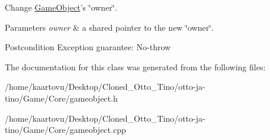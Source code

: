 Change \hyperlink{class_course_1_1_game_object}{Game\-Object}'s \char`\"{}owner\char`\"{}. 


\begin{DoxyParams}{Parameters}
{\em owner} & a shared pointer to the new \char`\"{}owner\char`\"{}. \\
\hline
\end{DoxyParams}
\begin{DoxyPostcond}{Postcondition}
Exception guarantee\-: No-\/throw 
\end{DoxyPostcond}


The documentation for this class was generated from the following files\-:\begin{DoxyCompactItemize}
\item 
/home/kaartovu/\-Desktop/\-Cloned\-\_\-\-Otto\-\_\-\-Tino/otto-\/ja-\/tino/\-Game/\-Core/gameobject.\-h\item 
/home/kaartovu/\-Desktop/\-Cloned\-\_\-\-Otto\-\_\-\-Tino/otto-\/ja-\/tino/\-Game/\-Core/gameobject.\-cpp\end{DoxyCompactItemize}
